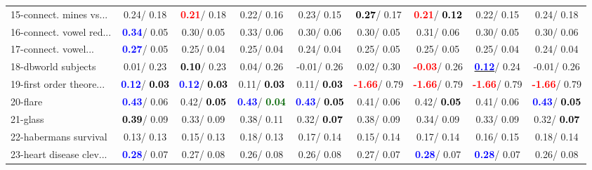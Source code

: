 \begin{table}[h]
\begin{center}
\begin{tabular}{lc|c|c|c|c|c|c|c}
15-connect. mines vs... &   0.24/  0.18 & \textcolor{red}{\textbf{  0.21}}/  0.18 &   0.22/  0.16 &   0.23/  0.15 & \textcolor{black}{\textbf{  0.27}}/  0.17 & \textcolor{red}{\textbf{  0.21}}/\textcolor{black}{\textbf{  0.12}} &   0.22/  0.15 &   0.24/  0.18 \\
16-connect. vowel red... & \textcolor{blue}{\textbf{  0.34}}/  0.05 &   0.30/  0.05 &   0.33/  0.06 &   0.30/  0.06 &   0.30/  0.05 &   0.31/  0.06 &   0.30/  0.05 &   0.30/  0.06 \\
17-connect. vowel... & \textcolor{blue}{\textbf{  0.27}}/  0.05 &   0.25/  0.04 &   0.25/  0.04 &   0.24/  0.04 &   0.25/  0.05 &   0.25/  0.05 &   0.25/  0.04 &   0.24/  0.04 \\
18-dbworld subjects &   0.01/  0.23 & \textcolor{black}{\textbf{  0.10}}/  0.23 &   0.04/  0.26 &  -0.01/  0.26 &   0.02/  0.30 & \textcolor{red}{\textbf{ -0.03}}/  0.26 & \underline{\textcolor{blue}{\textbf{  0.12}}}/  0.24 &  -0.01/  0.26 \\
19-first order theore... & \textcolor{blue}{\textbf{  0.12}}/\textcolor{black}{\textbf{  0.03}} & \textcolor{blue}{\textbf{  0.12}}/\textcolor{black}{\textbf{  0.03}} &   0.11/\textcolor{black}{\textbf{  0.03}} &   0.11/\textcolor{black}{\textbf{  0.03}} & \textcolor{red}{\textbf{ -1.66}}/  0.79 & \textcolor{red}{\textbf{ -1.66}}/  0.79 & \textcolor{red}{\textbf{ -1.66}}/  0.79 & \textcolor{red}{\textbf{ -1.66}}/  0.79 \\
20-flare & \textcolor{blue}{\textbf{  0.43}}/  0.06 &   0.42/\textcolor{black}{\textbf{  0.05}} & \textcolor{blue}{\textbf{  0.43}}/\textcolor{darkgreen}{\textbf{  0.04}} & \textcolor{blue}{\textbf{  0.43}}/\textcolor{black}{\textbf{  0.05}} &   0.41/  0.06 &   0.42/\textcolor{black}{\textbf{  0.05}} &   0.41/  0.06 & \textcolor{blue}{\textbf{  0.43}}/\textcolor{black}{\textbf{  0.05}} \\
21-glass & \textcolor{black}{\textbf{  0.39}}/  0.09 &   0.33/  0.09 &   0.38/  0.11 &   0.32/\textcolor{black}{\textbf{  0.07}} &   0.38/  0.09 &   0.34/  0.09 &   0.33/  0.09 &   0.32/\textcolor{black}{\textbf{  0.07}} \\ \hline
22-habermans survival &   0.13/  0.13 &   0.15/  0.13 &   0.18/  0.13 &   0.17/  0.14 &   0.15/  0.14 &   0.17/  0.14 &   0.16/  0.15 &   0.18/  0.14 \\
23-heart disease clev... & \textcolor{blue}{\textbf{  0.28}}/  0.07 &   0.27/  0.08 &   0.26/  0.08 &   0.26/  0.08 &   0.27/  0.07 & \textcolor{blue}{\textbf{  0.28}}/  0.07 & \textcolor{blue}{\textbf{  0.28}}/  0.07 &   0.26/  0.08 \\

\end{tabular}
\end{center}
\end{table}
